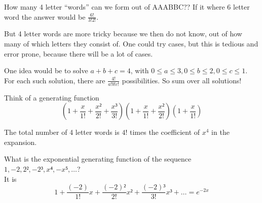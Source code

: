 \documentclass[english]{lbscript}
\begin{document}
\begin{example}{How many 4 letter \enquote{words} can we form out of AAABBC??}{}
	If it where 6 letter word the answer would be \(\frac{6!}{3!2!}\).

	But 4 letter words are more tricky because we then do not know, out of how many of which letters they consist of. One could try cases, but this is tedious and error prone, because there will be a lot of cases.

	One idea would be to solve \(a+b+c=4\), with \(0≤a≤3,0≤b≤2, 0≤c≤1\).\\
	For each such solution, there are \(\frac{4!}{a!b!c!}\) possibilities. So sum over all solutions!

	Think of a generating function
	\begin{equation}
		\label{eq:45}
		\left(1+ \frac{x}{1!} + \frac{x²}{2!} + \frac{x³}{3!} \right) \left(1+\frac{x}{1!} + \frac{x²}{2!} \right)  \left(1+ \frac{x}{1!} \right)
	\end{equation}

	The total number of 4 letter words is \(4!\) times the coefficient of \(x^{4}\) in the expansion.
\end{example}

\begin{example}{}{}
	What is the exponential generating function of the sequence \(1, -2, 2², -2³,x⁴,-x⁵,\dots\)?\\
	It is
	\begin{equation}
		\label{eq:46}
		1+ \frac{(-2)}{1!}x + \frac{(-2)²}{2!}x² + \frac{(-2)³}{3!}x³+\dots=e^{-2x}
	\end{equation}
\end{example}
\end{document}
